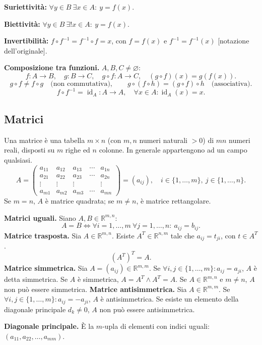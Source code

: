 \documentclass[11pt,a4paper]{article}
\newcommand{\pagina}[1]{\clearpage}
\begin{document}
\textbf{Suriettività:} $\forall y\in B\ \exists x\in A:\ y=f(x)$.

\textbf{Biettività:} $\forall y\in B\ \exists!x\in A:\ y=f(x)$.

\textbf{Invertibilità:} $f\circ f^{-1}=f^{-1}\circ f=x$, con $f=f(x)$ e $f^{-1}=f^{-1}(x)$ [notazione dell'originale].

\textbf{Composizione tra funzioni.} $A,B,C\ne\varnothing$:
\[ f:A\to B,\quad g:B\to C,\quad g\circ f:A\to C,\quad(g\circ f)(x)=g(f(x)).\]
\pagina{7}
\[g\circ f\ne f\circ g\quad\text{(non commutativa)},\qquad
 g\circ(f\circ h)=(g\circ f)\circ h\quad\text{(associativa)}.\]
\[f\circ f^{-1}=\operatorname{id}_A:A\to A,\quad
\forall x\in A:\operatorname{id}_A(x)=x.\]
\subsection*{Matrici}
Una matrice è una tabella $m\times n$ (con $m,n$ numeri naturali $>0$) di $mn$ numeri reali, disposti su $m$ righe ed $n$ colonne. In generale appartengono ad un campo qualsiasi.
\[A=\begin{pmatrix}a_{11}&a_{12}&a_{13}&\cdots&a_{1n}\\a_{21}&a_{22}&a_{23}&\cdots&a_{2n}\\\vdots&\vdots&\vdots&&\vdots\\a_{m1}&a_{m2}&a_{m3}&\cdots&a_{mn}\end{pmatrix}=(a_{ij}),\quad i\in\{1,\ldots,m\},\ j\in\{1,\ldots,n\}.\]
Se $m=n$, $A$ è matrice quadrata; se $m\ne n$, è matrice rettangolare.

\textbf{Matrici uguali.} Siano $A,B\in\mathbb R^{m,n}$:
\[ A=B\Longleftrightarrow\forall i=1,\ldots,m\ \forall j=1,\ldots,n:\ a_{ij}=b_{ij}.\]
\textbf{Matrice trasposta.} Sia $A\in\mathbb R^{m,n}$. Esiste $A^T\in\mathbb R^{n,m}$ tale che $a_{ij}=t_{ji}$, con $t\in A^T$.
\[(A^T)^T=A.\]
\textbf{Matrice simmetrica.} Sia $A=(a_{ij})\in\mathbb R^{m,m}$. Se $\forall i,j\in\{1,\ldots,m\}:a_{ij}=a_{ji}$, $A$ è detta simmetrica.
Se $A$ è simmetrica, $A=A^T\wedge A^T=A$. Se $A\in\mathbb R^{m,n}$ e $m\ne n$, $A$ non può essere simmetrica.
\pagina{8}
\textbf{Matrice antisimmetrica.} Sia $A\in\mathbb R^{m,m}$. Se $\forall i,j\in\{1,\ldots,m\}:a_{ij}=-a_{ji}$, $A$ è antisimmetrica. Se esiste un elemento della diagonale principale $d_k\ne0$, $A$ non può essere antisimmetrica.

\textbf{Diagonale principale.} È la $m$-upla di elementi con indici uguali: $(a_{11},a_{22},\ldots,a_{mm})$.
\end{document}
